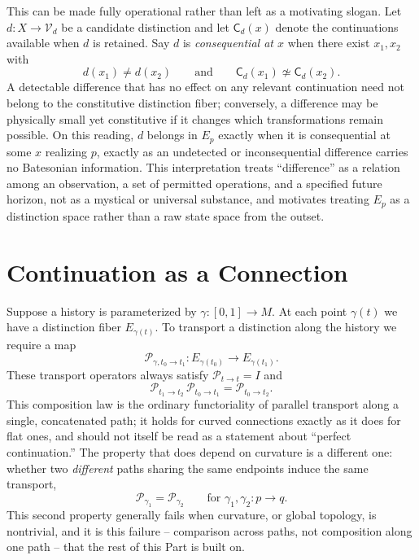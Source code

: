 \documentclass[11pt]{article}
\begin{document}
This can be made fully operational rather than left as a motivating slogan. Let $d : X \to \mathcal{V}_d$ be a candidate distinction and let $\mathsf{C}_d(x)$ denote the continuations available when $d$ is retained. Say $d$ is \emph{consequential at $x$} when there exist $x_1, x_2$ with
\[
d(x_1) \neq d(x_2) \qquad \text{and} \qquad \mathsf{C}_d(x_1) \not\simeq \mathsf{C}_d(x_2).
\]
A detectable difference that has no effect on any relevant continuation need not belong to the constitutive distinction fiber; conversely, a difference may be physically small yet constitutive if it changes which transformations remain possible. On this reading, $d$ belongs in $E_p$ exactly when it is consequential at some $x$ realizing $p$, exactly as an undetected or inconsequential difference carries no Batesonian information. This interpretation treats ``difference'' as a relation among an observation, a set of permitted operations, and a specified future horizon, not as a mystical or universal substance, and motivates treating $E_p$ as a distinction space rather than a raw state space from the outset.

\section{Continuation as a Connection}

Suppose a history is parameterized by $\gamma : [0,1] \rightarrow M$. At each point $\gamma(t)$ we have a distinction fiber $E_{\gamma(t)}$. To transport a distinction along the history we require a map
\[
\mathcal{P}_{\gamma, t_0 \rightarrow t_1} : E_{\gamma(t_0)} \rightarrow E_{\gamma(t_1)}.
\]
These transport operators always satisfy $\mathcal{P}_{t \rightarrow t} = I$ and
\[
\mathcal{P}_{t_1 \rightarrow t_2}\, \mathcal{P}_{t_0 \rightarrow t_1} = \mathcal{P}_{t_0 \rightarrow t_2}.
\]
This composition law is the ordinary functoriality of parallel transport along a single, concatenated path; it holds for curved connections exactly as it does for flat ones, and should not itself be read as a statement about ``perfect continuation.'' The property that does depend on curvature is a different one: whether two \emph{different} paths sharing the same endpoints induce the same transport,
\[
\mathcal{P}_{\gamma_1} = \mathcal{P}_{\gamma_2} \qquad \text{for } \gamma_1, \gamma_2 : p \to q.
\]
This second property generally fails when curvature, or global topology, is nontrivial, and it is this failure -- comparison across paths, not composition along one path -- that the rest of this Part is built on.
\end{document}
